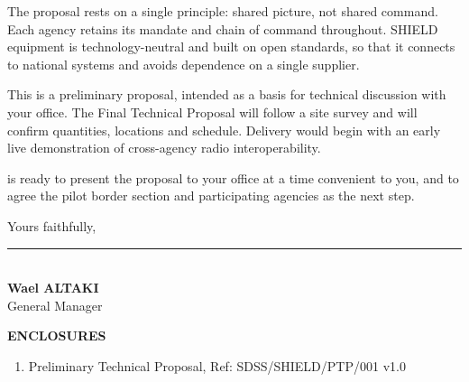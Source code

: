 \documentclass[10pt,letterpaper]{article}
\begin{document}
The proposal rests on a single principle: shared picture, not shared command. Each agency retains its mandate and chain of command throughout. SHIELD equipment is technology-neutral and built on open standards, so that it connects to national systems and avoids dependence on a single supplier.

This is a preliminary proposal, intended as a basis for technical discussion with your office. The Final Technical Proposal will follow a site survey and will confirm quantities, locations and schedule. Delivery would begin with an early live demonstration of cross-agency radio interoperability.

\CompanyShort{} is ready to present the proposal to your office at a time convenient to you, and to agree the pilot border section and participating agencies as the next step.

\vspace{2pt}
Yours faithfully,

\vspace{16pt}
\rule{2.35in}{0.4pt}\\[-1pt]
{\color{SDSSNavy}\bfseries Wael ALTAKI}\\[-1pt]
General Manager\\[-1pt]
\CompanyFull

\vspace{5pt}
{\color{SDSSNavy}\bfseries ENCLOSURES}

\begin{enumerate}[leftmargin=1.6em,itemsep=0pt,topsep=1pt]
  \item Preliminary Technical Proposal, Ref: SDSS/SHIELD/PTP/001 v1.0
\end{enumerate}
\end{document}
